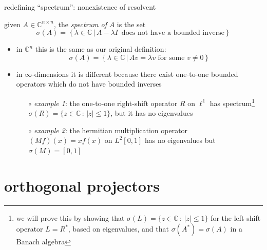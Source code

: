 \documentclass[10pt,hyperref]{beamer}
\newcommand{\CC}{\mathbb{C}}
\begin{document}
\begin{frame}{redefining ``spectrum'': nonexistence of resolvent}

\begin{definition}
given $A\in\CC^{n\times n}$, the \emph{spectrum of} $A$ is the set
    $$\sigma(A) = \left\{\lambda\in\CC\,\big|\,A-\lambda I \,\text{ does not have a bounded inverse} \right\}$$
\end{definition}

\begin{itemize}
\item in $\CC^n$ this is the same as our original definition:
    $$\sigma(A)=\left\{\lambda\in\CC\,\big|\,Av=\lambda v \text{ for some }v\ne 0\right\}$$
\item in $\infty$-dimensions it is different because there exist one-to-one bounded operators which do not have bounded inverses
    \begin{itemize}
    \item[$\circ$] \emph{example 1}: the one-to-one right-shift operator $R$ on $\ell^1$ has spectrum\footnote{we will prove this by showing that $\sigma(L) = \{z\in\CC\,:\,|z|\le 1\}$ for the left-shift operator $L=R^*$, based on eigenvalues, and that $\sigma(A^*)=\sigma(A)$ in a Banach algebra} $\sigma(R) = \{z\in\CC\,:\,|z|\le 1\}$, but it has no eigenvalues
    \item[$\circ$] \emph{example 2}: the hermitian multiplication operator $(M f)(x) = x f(x)$ on $L^2[0,1]$ has no eigenvalues but $\sigma(M) = [0,1]$
    \end{itemize}
\end{itemize}
\end{frame}


\section{orthogonal projectors}
\end{document}
